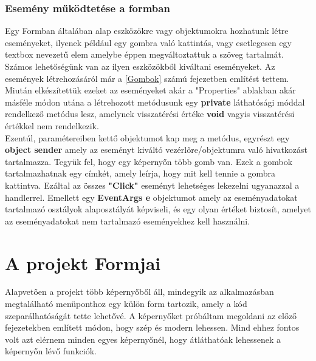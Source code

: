 \documentclass[tocnopagenum]{thesis-ekf}
\theoremstyle{definition}
\theoremstyle{remark}
\begin{document}
	\subsubsection{Esemény működtetése a formban}
	\label{esemenyformban}
	Egy Formban általában alap eszközökre vagy objektumokra hozhatunk létre eseményeket, ilyenek például egy gombra való kattintás, vagy esetlegesen egy textbox nevezetű elem amelybe éppen megváltoztattuk a szöveg tartalmát.
	Számos lehetőségünk van az ilyen eszközökből kiváltani eseményeket.
	Az események létrehozásáról már a \ref{Gombok} számú fejezetben említést tettem.
	Miután elkészítettük ezeket az eseményeket akár a "Properties" ablakban akár másféle módon utána a létrehozott metódusunk egy \textbf{private} láthatósági móddal rendelkező metódus lesz, amelynek visszatérési értéke \textbf{void} vagyis visszatérési értékkel nem rendelkezik. 
	\\
	Ezentúl, paramétereiben kettő objektumot kap meg a metódus, egyrészt egy \textbf{object sender} amely az eseményt kiváltó vezérlőre/objektumra való hivatkozást tartalmazza. Tegyük fel, hogy egy képernyőn több gomb van. Ezek a gombok tartalmazhatnak egy címkét, amely leírja, hogy mit kell tennie a gombra kattintva. Ezáltal az összes \textbf{"Click"} eseményt lehetséges lekezelni ugyanazzal a handlerrel.
	Emellett egy \textbf{EventArgs e} objektumot amely az eseményadatokat tartalmazó osztályok alaposztályát képviseli, és egy olyan értéket biztosít, amelyet az eseményadatokat nem tartalmazó eseményekhez kell használni. 
	\cite{eventobjargs}
	
	\section{A projekt Formjai}
	Alapvetően a projekt több képernyőből áll, mindegyik az alkalmazásban megtalálható menüponthoz egy külön form tartozik, amely a kód szeparálhatóságát tette lehetővé.
	A képernyőket próbáltam megoldani az előző fejezetekben említett módon, hogy szép és modern lehessen. Mind ehhez fontos volt azt elérnem minden egyes képernyőnél, hogy átláthatóak lehessenek a képernyőn lévő funkciók.
	\\
\end{document}
